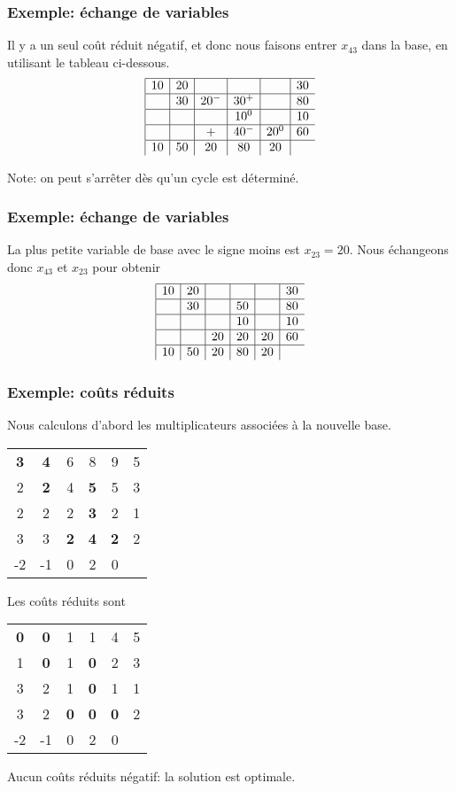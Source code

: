 \documentclass[usepdftitle=false]{beamer}
\begin{document}
\begin{frame}
\frametitle{Exemple: échange de variables}

Il y a un seul coût réduit négatif, et donc nous faisons entrer $x_{43}$ dans la base, en utilisant le tableau ci-dessous.
$$
\begin{array}{|c|c|c|c|c|c}
\hline
10 & 20 & & & & 30 \\
\hline
& 30 & 20^- & 30^+ & & 80 \\
\hline
& & & 10^0 & & 10 \\
\hline
& & + & 40^- & 20^0 & 60 \\
\hline
10 & 50 & 20 & 80 & 20 &
\end{array}
$$

Note: on peut s'arrêter dès qu'un cycle est déterminé.

\end{frame}

\begin{frame}
\frametitle{Exemple: échange de variables}

La plus petite variable de base avec le signe moins est $x_{23} = 20$. Nous échangeons donc $x_{43}$ et $x_{23}$ pour obtenir
$$
\begin{array}{|c|c|c|c|c|c}
	\hline
	10 & 20 & & & & 30 \\
	\hline
	& 30 & & 50 & & 80 \\
	\hline
	& & & 10 & & 10 \\
	\hline
	& & 20 & 20 & 20 & 60 \\
	\hline
	10 & 50 & 20 & 80 & 20 &
\end{array}
$$

\end{frame}

\begin{frame}
\frametitle{Exemple: coûts réduits}

Nous calculons d'abord les multiplicateurs associées à la nouvelle base.
\begin{center}
	\begin{tabular}{ccccc|c}
		{\bf 3} & {\bf 4} & 6 & 8 & 9 & 5 \\
		2 & {\bf 2} & 4 & {\bf 5} & 5 & 3 \\
		2 & 2 & 2 & {\bf 3} & 2 & 1 \\
		3 & 3 & {\bf 2} & {\bf 4} & {\bf 2} & 2 \\
		\hline
		-2 & -1 & 0 & 2 & 0 & 
	\end{tabular}
\end{center}
Les coûts réduits sont
\begin{center}
	\begin{tabular}{ccccc|c}
		{\bf 0} & {\bf 0} & 1 & 1 & 4 & 5 \\
		1 & {\bf 0} & 1 & {\bf 0} & 2 & 3 \\
		3 & 2 & 1 & {\bf 0} & 1 & 1 \\
		3 & 2 & {\bf 0} & {\bf 0} & {\bf 0} & 2 \\
		\hline
		-2 & -1 & 0 & 2 & 0 & 
	\end{tabular}
\end{center}
Aucun coûts réduits négatif: la solution est optimale.

\end{frame}
\end{document}
